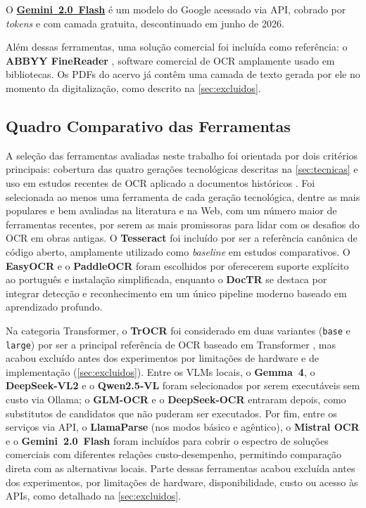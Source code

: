 \documentclass[noabntexcite,oneside]{ufsc-thesis-rn46-2019}
\begin{document}
O \href{https://ai.google.dev/gemini-api/docs/models}{\textbf{Gemini~2.0~Flash}}
\cite{gemini_pricing} é um modelo do Google acessado via API, cobrado por
\textit{tokens} e com camada gratuita, descontinuado em junho de 2026.

Além dessas ferramentas, uma solução comercial foi incluída como referência: o
\textbf{ABBYY FineReader} \cite{abbyy_finereader}, software comercial de OCR amplamente
usado em bibliotecas. Os PDFs do acervo já contêm uma camada de texto gerada por ele no
momento da digitalização, como descrito na \autoref{sec:excluidos}.

\subsection{Quadro Comparativo das Ferramentas}

A seleção das ferramentas avaliadas neste trabalho foi orientada por dois critérios
principais: cobertura das quatro gerações tecnológicas descritas na
\autoref{sec:tecnicas} e uso em estudos recentes de OCR aplicado a documentos históricos
\cite{huang2021,vesalainen2025}. Foi selecionada ao menos uma
ferramenta de cada geração tecnológica, dentre as mais populares e bem avaliadas na
literatura e na Web, com um número maior de ferramentas recentes, por serem as mais
promissoras para lidar com os desafios do OCR em obras antigas. O \textbf{Tesseract} foi incluído por
ser a referência canônica de código aberto, amplamente utilizado como \textit{baseline}
em estudos comparativos. O \textbf{EasyOCR} e o \textbf{PaddleOCR} foram escolhidos por
oferecerem suporte explícito ao português e instalação simplificada, enquanto o
\textbf{DocTR} se destaca por integrar detecção e reconhecimento em um único pipeline
moderno baseado em aprendizado profundo.

Na categoria Transformer, o \textbf{TrOCR} foi considerado em duas variantes
(\texttt{base} e \texttt{large}) por ser a principal referência de OCR baseado em
Transformer \cite{huang2021}, mas acabou excluído antes dos experimentos por limitações
de hardware e de implementação (\autoref{sec:excluidos}). Entre os VLMs locais, o \textbf{Gemma~4}, o
\textbf{DeepSeek-VL2} e o \textbf{Qwen2.5-VL} foram selecionados por serem executáveis
sem custo via Ollama; o \textbf{GLM-OCR} e o \textbf{DeepSeek-OCR} entraram depois, como
substitutos de candidatos que não puderam ser executados. Por fim, entre os serviços via API, o \textbf{LlamaParse} (nos
modos básico e agêntico), o \textbf{Mistral OCR} e o \textbf{Gemini~2.0~Flash} foram
incluídos para cobrir o espectro de soluções comerciais com diferentes relações
custo-desempenho, permitindo comparação direta com as alternativas locais. Parte dessas
ferramentas acabou excluída antes dos experimentos, por limitações de hardware,
disponibilidade, custo ou acesso às APIs, como detalhado na \autoref{sec:excluidos}.
\end{document}
